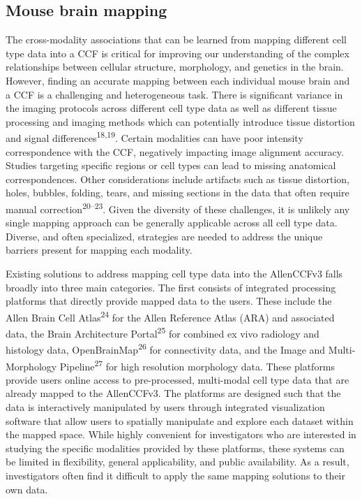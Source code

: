 \documentclass[
  12pt,
]{article}
\begin{document}
\subsection{Mouse brain mapping}\label{mouse-brain-mapping}

The cross-modality associations that can be learned from mapping
different cell type data into a CCF is critical for improving our
understanding of the complex relationships between cellular structure,
morphology, and genetics in the brain. However, finding an accurate
mapping between each individual mouse brain and a CCF is a challenging
and heterogeneous task. There is significant variance in the imaging
protocols across different cell type data as well as different tissue
processing and imaging methods which can potentially introduce tissue
distortion and signal differences\textsuperscript{18,19}. Certain
modalities can have poor intensity correspondence with the CCF,
negatively impacting image alignment accuracy. Studies targeting
specific regions or cell types can lead to missing anatomical
correspondences. Other considerations include artifacts such as tissue
distortion, holes, bubbles, folding, tears, and missing sections in the
data that often require manual correction\textsuperscript{20--23}. Given
the diversity of these challenges, it is unlikely any single mapping
approach can be generally applicable across all cell type data. Diverse,
and often specialized, strategies are needed to address the unique
barriers present for mapping each modality.

Existing solutions to address mapping cell type data into the AllenCCFv3
falls broadly into three main categories. The first consists of
integrated processing platforms that directly provide mapped data to the
users. These include the Allen Brain Cell Atlas\textsuperscript{24} for
the Allen Reference Atlas (ARA) and associated data, the Brain
Architecture Portal\textsuperscript{25} for combined ex vivo radiology
and histology data, OpenBrainMap\textsuperscript{26} for connectivity
data, and the Image and Multi-Morphology Pipeline\textsuperscript{27}
for high resolution morphology data. These platforms provide users
online access to pre-processed, multi-modal cell type data that are
already mapped to the AllenCCFv3. The platforms are designed such that
the data is interactively manipulated by users through integrated
visualization software that allow users to spatially manipulate and
explore each dataset within the mapped space. While highly convenient
for investigators who are interested in studying the specific modalities
provided by these platforms, these systems can be limited in
flexibility, general applicability, and public availability. As a
result, investigators often find it difficult to apply the same mapping
solutions to their own data.
\end{document}
